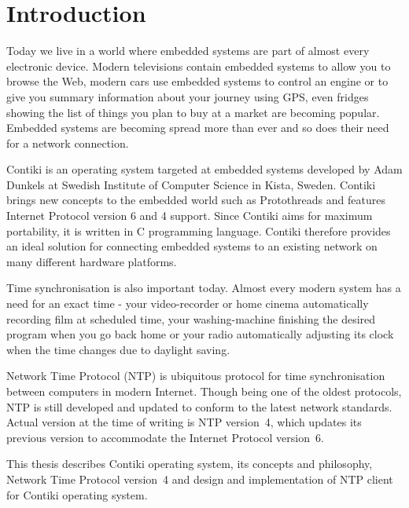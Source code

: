 
\chapter{Introduction}
Today we live in a world where embedded systems are part of almost every electronic device.
Modern televisions contain embedded systems to allow you to browse the Web,
modern cars use embedded systems to control an engine or to give you summary information
about your journey using GPS, even fridges showing the list of things you plan to buy at a market are becoming popular.
Embedded systems are becoming spread more than ever and so does
their need for a network connection.

Contiki is an operating system targeted at embedded systems
developed by Adam Dunkels at Swedish Institute of Computer Science in Kista, Sweden.
Contiki brings new concepts to the embedded world such as Protothreads and features
Internet Protocol version 6 and 4 support.
Since Contiki aims for maximum portability, it is written in C programming language.
Contiki therefore provides an ideal solution for connecting
embedded systems to an existing network on many different hardware platforms.

Time synchronisation is also important today.
Almost every modern system has a need for an exact time -
your video-recorder or home cinema automatically recording film at scheduled time,
your washing-machine finishing the
desired program when you go back home or your radio automatically adjusting its clock when the time changes
due to daylight saving.

Network Time Protocol (NTP) is ubiquitous protocol for time synchronisation between computers in modern Internet.
Though being one of the oldest protocols, NTP is still developed and updated to conform to the latest
network standards. Actual version at the time of writing is NTP version~4, which updates its previous version to
accommodate the Internet Protocol version~6.

This thesis describes Contiki operating system, its concepts and philosophy,
Network Time Protocol version~4 and design and implementation of NTP client for Contiki operating system.








